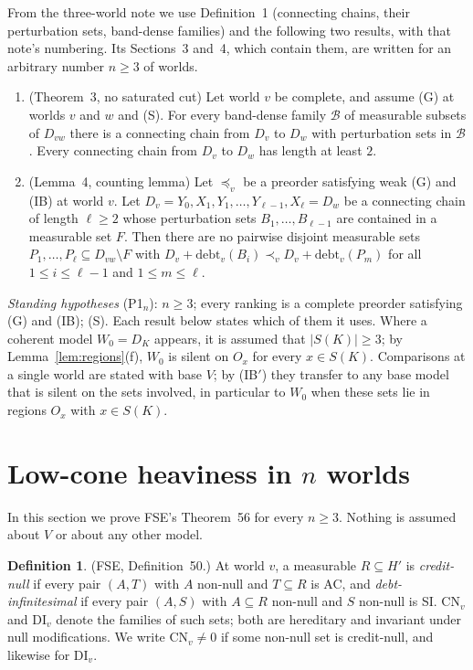 \documentclass[11pt]{article}
\theoremstyle{definition}\newtheorem{definition}[theorem]{Definition}
\theoremstyle{remark}\newtheorem{remark}[theorem]{Remark}
\newcommand{\debt}{\mathrm{debt}}
\newcommand{\Bfam}{\mathcal B}
\newcommand{\CN}{\mathrm{CN}}
\newcommand{\DI}{\mathrm{DI}}
\begin{document}
From the three-world note we use Definition~1 (connecting chains, their
perturbation sets, band-dense families) and the following two results,
with that note's numbering. Its Sections~3 and~4, which contain them, are
written for an arbitrary number $n\ge3$ of worlds.
\begin{enumerate}[label=(N\arabic*),leftmargin=*,itemsep=3pt]
\item\label{in:cut} (Theorem~3, no saturated cut) Let world $v$ be
complete, and assume (G) at worlds $v$ and $w$ and (S). For every
band-dense family $\Bfam$ of measurable subsets of $D_{vw}$ there is a
connecting chain from $D_v$ to $D_w$ with perturbation sets in $\Bfam$.
Every connecting chain from $D_v$ to $D_w$ has length at least $2$.
\item\label{in:count} (Lemma~4, counting lemma) Let $\preceq_v$ be a
preorder satisfying weak (G) and (IB) at world $v$. Let
$D_v=Y_0,X_1,Y_1,\dots,Y_{\ell-1},X_\ell=D_w$ be a connecting chain of
length $\ell\ge2$ whose perturbation sets $B_1,\dots,B_{\ell-1}$ are
contained in a measurable set $F$. Then there are no pairwise disjoint
measurable sets $P_1,\dots,P_\ell\subseteq D_{vw}\setminus F$ with
$D_v+\debt_v(B_i)\prec_vD_v+\debt_v(P_m)$ for all $1\le i\le\ell-1$ and
$1\le m\le\ell$.
\end{enumerate}

\emph{Standing hypotheses} (P1$_n$): $n\ge3$; every ranking is a complete
preorder satisfying (G) and (IB); (S). Each result below states which of
them it uses. Where a coherent model $W_0=D_K$ appears, it is assumed that
$|S(K)|\ge3$; by Lemma~\ref{lem:regions}(f), $W_0$ is silent on $O_x$ for
every $x\in S(K)$. Comparisons at a single world are stated with base $V$;
by (IB$'$) they transfer to any base model that is silent on the sets
involved, in particular to $W_0$ when these sets lie in regions $O_x$ with
$x\in S(K)$.

\section{Low-cone heaviness in \texorpdfstring{$n$}{n} worlds}\label{sec:LH}

In this section we prove FSE's Theorem~56 for every $n\ge3$. Nothing is
assumed about $V$ or about any other model.

\begin{definition}\label{def:CN}
(FSE, Definition~50.) At world $v$, a measurable $R\subseteq H'$ is
\emph{credit-null} if every pair $(A,T)$ with $A$ non-null and $T\subseteq
R$ is AC, and \emph{debt-infinitesimal} if every pair $(A,S)$ with
$A\subseteq R$ non-null and $S$ non-null is SI. $\CN_v$ and $\DI_v$ denote
the families of such sets; both are hereditary and invariant under null
modifications. We write $\CN_v\ne0$ if some non-null set is credit-null,
and likewise for $\DI_v$.
\end{definition}
\end{document}
